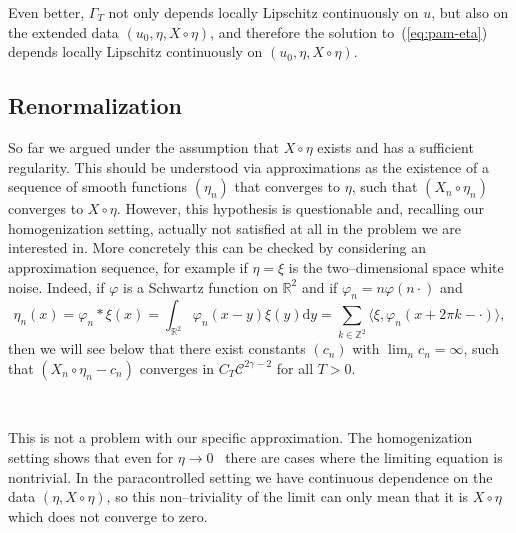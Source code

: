\documentclass[a4paper,11pt]{article}
\newcommand{\cdummy}{\cdot}
\newcommand{\comma}{{,}}
\newcommand{\mathd}{\mathrm{d}}
\newcommand{\CC}{\mathscr{C}}
\newcommand{\reso}{\,\mathord{\circ}\,}
\begin{document}
Even better, $\Gamma_T$ not only depends locally Lipschitz continuously on
$u$, but also on the extended data $(u_0, \eta \comma X \reso \eta)$, and
therefore the solution to~(\ref{eq:pam-eta}) depends locally Lipschitz
continuously on $ (u_0, \eta, X \reso \eta)$.

\subsection{Renormalization}

So far we argued under the assumption that $X \reso \eta$ exists and has a
sufficient regularity. This should be understood via approximations as the
existence of a sequence of smooth functions $(\eta_n)$ that converges to
$\eta$, such that $(X_n \reso \eta_n)$ converges to $X \reso \eta$. However,
this hypothesis is questionable and, recalling our homogenization setting,
actually not satisfied at all in the problem we are interested in. More
concretely this can be checked by considering an approximation sequence, for
example if $\eta = \xi$ is the two--dimensional space white noise. Indeed, if
$\varphi$ is a Schwartz function on $\mathbb{R}^2$ and if $\varphi_n = n
\varphi (n \cdummy)$ and
\[ \eta_n (x) = \varphi_n \ast \xi (x) = \int_{\mathbb{R}^2} \varphi_n (x -
   y) \xi (y) \mathd y = \sum_{k \in \mathbb{Z}^2} \langle \xi, \varphi_n (x
   + 2 \pi k - \cdummy) \rangle, \]
then we will see below that there exist constants $(c_n)$ with $\lim_n c_n =
\infty$, such that $(X_n \reso \eta_n - c_n)$ converges in $C_T \CC^{2 \gamma
- 2}$ for all $T > 0$.

\

This is not a problem with our specific approximation. The homogenization
setting shows that even for $\eta \rightarrow 0$ \ there are cases where the
limiting equation is nontrivial. In the paracontrolled setting we have
continuous dependence on the data $(\eta, X \reso \eta)$, so this
non--triviality of the limit can only mean that it is $X \reso \eta$ which
does not converge to zero.

\
\end{document}
